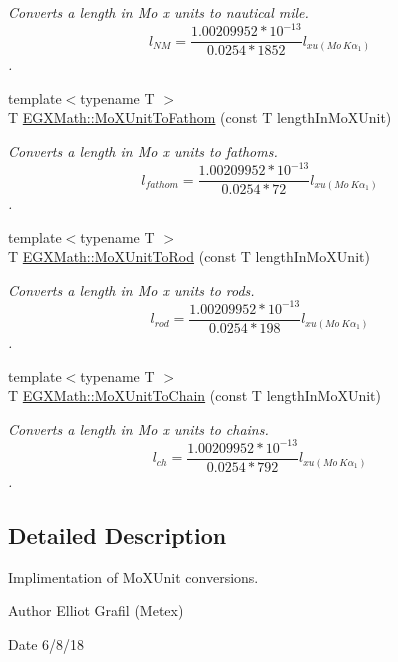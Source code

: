 \begin{DoxyCompactItemize}
\begin{DoxyCompactList}\small\item\em Converts a length in Mo x units to nautical mile. \[ l_{NM}= \frac{1.00209952*10^{-13}}{0.0254 * 1852} l_{xu(Mo\ K\alpha_1)} \]. \end{DoxyCompactList}\item 
{\footnotesize template$<$typename T $>$ }\\T \mbox{\hyperlink{group___e_g_x_math-_conversions-_length_conversions-_non-_s_i-_mo_x_unit-_nautical_gaac0c77d19dcc5ce04affa038de610b4a}{E\+G\+X\+Math\+::\+Mo\+X\+Unit\+To\+Fathom}} (const T length\+In\+Mo\+X\+Unit)
\begin{DoxyCompactList}\small\item\em Converts a length in Mo x units to fathoms. \[ l_{fathom}= \frac{1.00209952*10^{-13}}{0.0254 * 72} l_{xu(Mo\ K\alpha_1)} \]. \end{DoxyCompactList}\item 
{\footnotesize template$<$typename T $>$ }\\T \mbox{\hyperlink{group___e_g_x_math-_conversions-_length_conversions-_non-_s_i-_mo_x_unit-_surveyors_ga087c126bbeacfc3f9786ce20c1d9c2e1}{E\+G\+X\+Math\+::\+Mo\+X\+Unit\+To\+Rod}} (const T length\+In\+Mo\+X\+Unit)
\begin{DoxyCompactList}\small\item\em Converts a length in Mo x units to rods. \[ l_{rod}= \frac{1.00209952*10^{-13}}{0.0254 * 198} l_{xu(Mo\ K\alpha_1)} \]. \end{DoxyCompactList}\item 
{\footnotesize template$<$typename T $>$ }\\T \mbox{\hyperlink{group___e_g_x_math-_conversions-_length_conversions-_non-_s_i-_mo_x_unit-_surveyors_ga07a643eb483183e8d391856d32f5a519}{E\+G\+X\+Math\+::\+Mo\+X\+Unit\+To\+Chain}} (const T length\+In\+Mo\+X\+Unit)
\begin{DoxyCompactList}\small\item\em Converts a length in Mo x units to chains. \[ l_{ch}= \frac{1.00209952*10^{-13}}{0.0254 * 792} l_{xu(Mo\ K\alpha_1)} \]. \end{DoxyCompactList}\end{DoxyCompactItemize}


\subsection{Detailed Description}
Implimentation of Mo\+X\+Unit conversions. 

\begin{DoxyAuthor}{Author}
Elliot Grafil (Metex) 
\end{DoxyAuthor}
\begin{DoxyDate}{Date}
6/8/18 
\end{DoxyDate}
